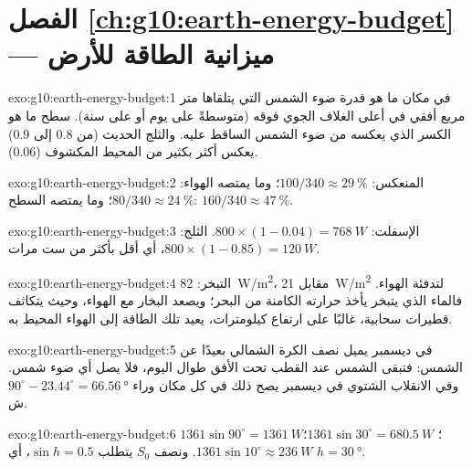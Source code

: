 \section*{الفصل \ref{ch:g10:earth-energy-budget} --- ميزانية الطاقة للأرض}

\begin{solution}{exo:g10:earth-energy-budget:1}
 في مكان ما هو قدرة ضوء الشمس التي يتلقاها متر مربع أفقي في أعلى الغلاف
الجوي فوقه (متوسطةً على يوم أو على سنة).  سطح ما هو الكسر الذي يعكسه من
ضوء الشمس الساقط عليه. والثلج الحديث (من 0.8 إلى 0.9) يعكس أكثر بكثير من المحيط
المكشوف (0.06).
\end{solution}

\begin{solution}{exo:g10:earth-energy-budget:2}
المنعكس: $100/340 \approx \qty{29}{\percent}$؛ وما يمتصه الهواء:
$80/340 \approx \qty{24}{\percent}$؛ وما يمتصه السطح: $160/340
\approx \qty{47}{\percent}$.
\end{solution}

\begin{solution}{exo:g10:earth-energy-budget:3}
الإسفلت: $800 \times (1 - 0.04) = \qty{768}{W}$. الثلج: $800 \times (1 -
0.85) = \qty{120}{W}$، أي أقل بأكثر من ست مرات.
\end{solution}

\begin{solution}{exo:g10:earth-energy-budget:4}
التبخر: \qty{82}{W/m^2}، مقابل \qty{21}{W/m^2} لتدفئة الهواء. فالماء الذي
يتبخر يأخذ حرارته الكامنة من البحر؛ ويصعد البخار مع الهواء، وحيث يتكاثف قطيرات
سحابية، غالبًا على ارتفاع كيلومترات، يعيد تلك الطاقة إلى الهواء المحيط به.
\end{solution}

\begin{solution}{exo:g10:earth-energy-budget:5}
في ديسمبر يميل نصف الكرة الشمالي بعيدًا عن الشمس: فتبقى الشمس عند القطب تحت الأفق
طوال اليوم، فلا يصل أي ضوء شمس. وفي الانقلاب الشتوي في ديسمبر يصح ذلك في كل
مكان وراء $90^\circ - 23.44^\circ =
\qty{66.56}{\degree}$ ش.
\end{solution}

\begin{solution}{exo:g10:earth-energy-budget:6}
$1361 \sin 90^\circ = \qty{1361}{W}$؛ $1361 \sin 30^\circ =
\qty{680.5}{W}$؛ $1361 \sin 10^\circ \approx \qty{236}{W}$. ونصف $S_0$
يتطلب $\sin h = 0.5$، أي $h = \qty{30}{\degree}$.
\end{solution}

